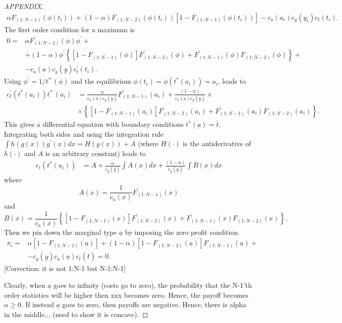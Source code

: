 \documentclass[12pt,]{article}
\newcommand\deadline{\bar{t}}
\newcommand\target{\underline{y}}
\newcommand\ctime{c_{t}}
\newcommand\cscore{c_{y}}
\newcommand\cability{c_{a}}
\newcommand\costs{\cability(a_i)\cscore(y_i)\ctime(t_i)}
\newcommand\marginaltype{\underline{a}}
\newcommand\mtype{\underline{a}}
\begin{document}
\begin{shaded}
\begin{proof}[APPENDIX]
\begin{align}
  \alpha F_{(1:N-1)}(\phi(t_i)) 
  + (1-\alpha) F_{(1:N-2)}(\phi(t_i))\left[1 - F_{(1:N-1)}(\phi(t_i))\right]
  - \costs.
\end{align}
The first order condition for a maximum \citep[see][]{moldovanu2001optimal} is
\begin{align} \label{foc0}
  0 = & \alpha F_{(1:N-1)}^{\prime}(\phi) \phi^{\prime} + \nonumber\\
    & + (1-\alpha)\phi^{\prime}\left\{
        \left[1 - F_{(1:N-1)}(\phi)\right]F_{(1:N-2)}^{\prime}(\phi)
        + F_{(1:N-1)}^{\prime}(\phi) F_{(1:N-2)}(\phi)\right\} + \nonumber\\
    & - c_{a}(a) c_{y}(\target) c_{t}^{\prime}(t_i).
\end{align}
Using $\phi^\prime =  1 / t^{*\prime}(\phi)$ and the equilibrium $\phi(t_i) = \phi(t^*(a_i)) = a_i$, leads to
\begin{align} \label{foc}
  c_{t}^{\prime}(t^{*}(a_i)) t^{*\prime}(a_i) 
      & = \frac{\alpha}{c_{a}(a) c_{y}(\target)} F_{(1:N-1)}^{\prime}(a_i)
        + \frac{(1-\alpha)}{c_{a}(a) c_{y}(\target)}\times \nonumber\\
      & \times\left\{\left[1 - F_{(1:N-1)}(a_i)\right]F_{(1:N-2)}^{\prime}(a_i)
        + F_{(1:N-1)}^{\prime}(a_i) F_{(1:N-2)}(a_i)\right\}.
\end{align}
This gives a differential equation with boundary conditions $t^*(\mtype) = \deadline$. 
Integrating both sides and using the integration rule $\int h(g(x)) g^\prime(x) dx = H(g(x)) + A$ (where $H(\cdot)$ is the antiderivative of $h(\cdot)$ and $A$ is an arbitrary constant) leads to
\begin{align} \label{foc}
  c_{t}(t^{*}(a_i))
      & = A + \frac{\alpha}{c_{y}(\target)} \int A(x) dx
        + \frac{(1-\alpha)}{c_{y}(\target)} \int B(x) dx
\end{align}
where 
\[
  A(x) = \frac{1}{c_{a}(x)} F_{(1:N-1)}^{\prime}(x)
\]
and
\[
  B(x) = \frac{1}{c_{a}(x)} \left\{
      \left[1- F_{(1:N-1)}(x)\right]F_{(1:N-2)}^{\prime}(x)
      + F_{(1:N-1)}^{\prime}(x) F_{(1:N-2)}(x)
    \right\}.
\]
Then we pin down the marginal type $\mtype$ by imposing the zero profit condition
\begin{align}
  \pi_i = & \alpha \left[1 - F_{(1:N-1)}(\mtype)\right] 
      + (1-\alpha) \left[1- F_{(1:N-2)}(\mtype)\right]F_{(1:N-1)}(\mtype) + \nonumber\\
    & - c_y(\target) c_a(\mtype) c_{t}(\deadline) = 0.
\end{align}
[Correction: it is not 1:N-1 but N-1:N-1]

Clearly, when $\marginaltype$ goes to infinity (costs go to zero), the probability that the N-1'th order statistics will be higher then xxx becomes zero. Hence, the payoff becomes $\alpha \geq 0$. If instead $\marginaltype$ goes to zero, then payoffs are negative. Hence, there is alpha in the middle... (need to show it is concave). 
\end{proof}
\end{shaded}
\end{document}
